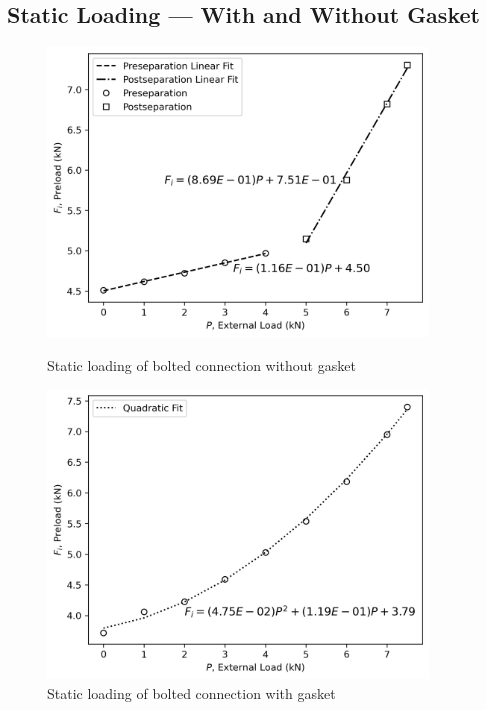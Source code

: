 \subsection{Static Loading --- With and Without Gasket}
\label{sec:static_loading_with_without_gasket}
\begin{figure}[h]
    \centering
    \begin{minipage}{0.48\textwidth}
        \centering
        \includegraphics[width=0.9\textwidth]{Sections/Figures/without_gasket_preseperation_vs_postseperation.png}
        \caption{Static loading of bolted connection without gasket}
        \label{fig:without_gasket_loading}
    \end{minipage}\hfill
    \begin{minipage}{0.48\textwidth}
        \centering
        \includegraphics[width=0.9\textwidth]{Sections/Figures/with_gasket_preseperation.png}
        \caption{Static loading of bolted connection with gasket}
        \label{fig:with_gasket_loading}
    \end{minipage}
\end{figure}
